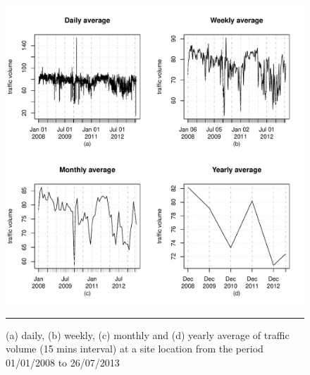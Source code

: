\begin{figure}[htbp]
  \centering
    \includegraphics[width=\textwidth,height=\textheight,keepaspectratio]{Figures/averages.pdf}
    \rule{35em}{0.5pt}
  \caption[Average Traffic Volume]{(a) daily, (b) weekly, (c) monthly and (d) yearly average of traffic volume (15 mins interval) at a site location from the period 01/01/2008 to 26/07/2013}
  \label{fig:AverageTrafficVolume}
\end{figure}

